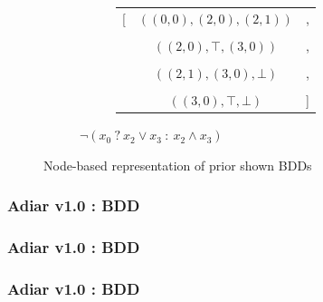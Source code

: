 \documentclass[english, aspectratio=169]{beamer}
\begin{document}
\begin{frame}
\begin{figure}
\begin{subfigure}{0.49\linewidth}
      \begin{subfigure}[b]{0.33\linewidth}
        \centering
        \begin{tikzpicture}[scale=0.6, every node/.style={transform shape}]
          
        \end{tikzpicture}
      \end{subfigure}
      \begin{subfigure}[b]{0.55\linewidth}
        \centering
        { \tiny
          \begin{tabular}{r c l}
            [ & $((0,0), (2,0), (2,1))$ & ,
            \\ \\
              & $((2,0), \top, (3,0))$ & ,
            \\ \\
              & $((2,1), (3,0), \bot)$   & ,
            \\ \\
              & $((3,0), \top, \bot)$   & ]
          \end{tabular}
          \vspace{10pt}
        }
      \end{subfigure}

      \caption{$\neg (x_0 \ ?\ x_2 \vee x_3 \ :\ x_2 \wedge x_3)$}
    \end{subfigure}

    \caption{Node-based representation of prior shown BDDs}
  \end{figure}

\end{frame}

\begin{frame}
  \frametitle{Adiar v1.0 : BDD}

  
\end{frame}

\begin{frame}
  \frametitle{Adiar v1.0 : BDD}

  
\end{frame}

\begin{frame}
  \frametitle{Adiar v1.0 : BDD}

  
\end{frame}

\end{document}
